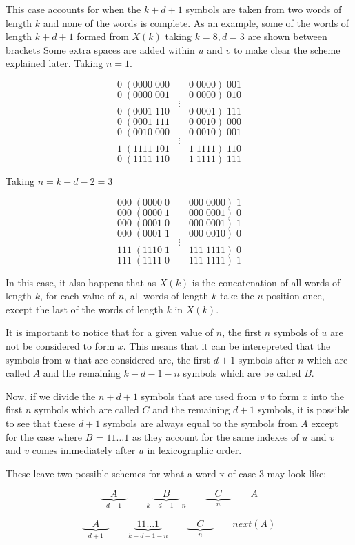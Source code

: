 \documentclass[11pt,a4paper,twoside]{tesis}
\theoremstyle{definition}
\begin{document}
This case accounts for when the $k + d + 1$ symbols are taken from two words of length $k$ and none of the words is complete.
As an example, some of the words of length $k + d + 1$ formed from $X(k)$ taking $k = 8, d = 3$ are shown between brackets
Some extra spaces are added within $u$ and $v$ to make clear the scheme explained later.
Taking $n = 1$.


$$0\; (0000\; 000 \qquad 0 \;0000 ) \;001$$
$$0\; (0000 \;001 \qquad 0 \;0000 ) \;010$$
$$\vdots$$
$$0\; (0001 \;110 \qquad 0 \;0001 ) \;111$$
$$0\; (0001 \;111 \qquad 0 \;0010 ) \;000$$
$$0\; (0010 \;000 \qquad 0 \;0010 ) \;001$$
$$\vdots$$
$$1\; (1111 \;101 \qquad 1 \;1111 ) \;110$$
$$0\; (1111 \;110 \qquad 1 \;1111 ) \;111$$

Taking $n = k - d - 2 = 3$

$$000\; (0000\; 0 \qquad 000 \;0000 ) \;1$$
$$000\; (0000\; 1 \qquad 000 \;0001 ) \;0$$
$$000\; (0001\; 0 \qquad 000 \;0001 ) \;1$$
$$000\; (0001\; 1 \qquad 000 \;0010 ) \;0$$
$$\vdots$$
$$111\; (1110\; 1 \qquad 111 \;1111 ) \;0$$
$$111\; (1111\; 0 \qquad 111 \;1111 ) \;1$$

In this case, it also happens that as $X(k)$ is the concatenation of all words of length $k$, for each value of $n$, all words of length $k$ take the $u$ position once, except the last of the words of length $k$ in $X(k)$.

It is important to notice that for a given value of $n$, the first $n$ symbols of $u$ are not be considered to form $x$. This means that it can be interepreted that the symbols from  $u$ that are considered are, the first $d + 1$ symbols after $n$ which are called $A$ and the remaining $k - d - 1 - n$ symbols which are be called $B$.

Now, if we divide the $n + d + 1$ symbols that are used from $v$ to form $x$ into the first $n$ symbols which are called $C$ and the remaining $d + 1$ symbols, it is possible to see that these $d + 1$ symbols are always equal to the symbols from $A$ except for the case where $B$ = $11\dots1$ as they account for the same indexes of $u$ and $v$ and $v$ comes immediately after $u$ in lexicographic order. 


These leave two possible schemes for what a word x of case 3 may look like:

$$\underbrace{\quad A \quad }_{d +1} \qquad \underbrace{\quad B \quad }_{k - d - 1 - n}  \qquad \underbrace{\quad C \quad }_{n} \qquad A$$

$$\underbrace{\quad A \quad }_{d +1} \qquad \underbrace{\; 11\dots1 \; }_{k - d - 1 - n}  \qquad \underbrace{\quad C \quad }_{n} \qquad next(A)$$
\end{document}
